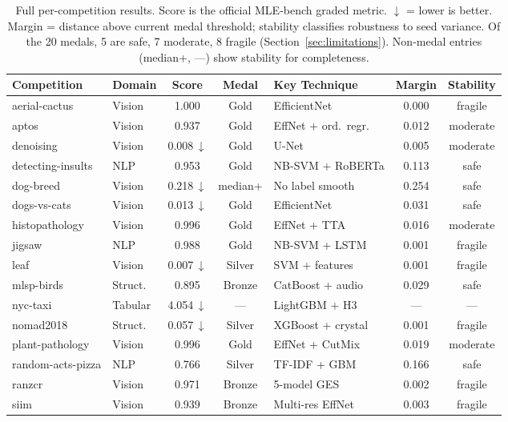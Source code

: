 \documentclass{article}
\begin{document}
\begin{table}[h]
\centering
\caption{Full per-competition results. Score is the official MLE-bench graded metric. $\downarrow$ = lower is better. Margin = distance above current medal threshold; stability classifies robustness to seed variance. Of the 20 medals, 5 are safe, 7 moderate, 8 fragile (Section~\ref{sec:limitations}). Non-medal entries (median+, ---) show stability for completeness.}
\label{tab:per_comp}
\small
\begin{tabular}{llcclcc}
\toprule
\textbf{Competition} & \textbf{Domain} & \textbf{Score} & \textbf{Medal} & \textbf{Key Technique} & \textbf{Margin} & \textbf{Stability} \\
\midrule
aerial-cactus & Vision & 1.000 & Gold & EfficientNet & 0.000 & fragile \\
aptos & Vision & 0.937 & Gold & EffNet + ord.\ regr. & 0.012 & moderate \\
denoising & Vision & 0.008\,$\downarrow$ & Gold & U-Net & 0.005 & moderate \\
detecting-insults & NLP & 0.953 & Gold & NB-SVM + RoBERTa & 0.113 & safe \\
dog-breed & Vision & 0.218\,$\downarrow$ & median+ & No label smooth & 0.254 & safe \\
dogs-vs-cats & Vision & 0.013\,$\downarrow$ & Gold & EfficientNet & 0.031 & safe \\
histopathology & Vision & 0.996 & Gold & EffNet + TTA & 0.016 & moderate \\
jigsaw & NLP & 0.988 & Gold & NB-SVM + LSTM & 0.001 & fragile \\
leaf & Vision & 0.007\,$\downarrow$ & Silver & SVM + features & 0.001 & fragile \\
mlsp-birds & Struct. & 0.895 & Bronze & CatBoost + audio & 0.029 & safe \\
nyc-taxi & Tabular & 4.054\,$\downarrow$ & --- & LightGBM + H3 & --- & --- \\
nomad2018 & Struct. & 0.057\,$\downarrow$ & Silver & XGBoost + crystal & 0.001 & fragile \\
plant-pathology & Vision & 0.996 & Gold & EffNet + CutMix & 0.019 & moderate \\
random-acts-pizza & NLP & 0.766 & Silver & TF-IDF + GBM & 0.166 & safe \\
ranzcr & Vision & 0.971 & Bronze & 5-model GES & 0.002 & fragile \\
siim & Vision & 0.939 & Bronze & Multi-res EffNet & 0.003 & fragile \\

\end{tabular}
\end{table}
\end{document}
